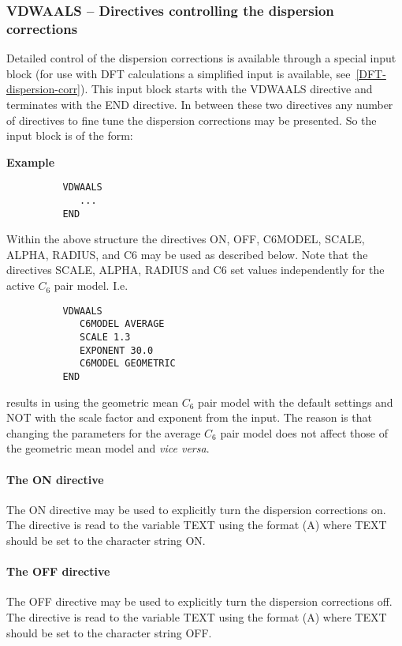 \documentclass[11pt,fleqn]{article}
\begin{document}
\subsubsection{VDWAALS -- Directives controlling the dispersion corrections}

Detailed control of the dispersion corrections is available through a special
input block (for use with DFT calculations a simplified input is available,
see~\ref{DFT-dispersion-corr}). This input block starts with the VDWAALS
directive and terminates with the END directive. In between these two
directives any number of directives to fine tune the dispersion corrections
may be presented. So the input block is of the form:

{\bf Example}

{
\footnotesize
\begin{verbatim}
          VDWAALS
             ...
          END
\end{verbatim}
}

Within the above structure the directives ON, OFF, C6MODEL, SCALE, ALPHA, 
RADIUS, and C6 may be used as described below. Note that the directives
SCALE, ALPHA, RADIUS and C6 set values independently for the active $C_6$ 
pair model. I.e. 
{
\footnotesize
\begin{verbatim}
          VDWAALS
             C6MODEL AVERAGE
             SCALE 1.3
             EXPONENT 30.0
             C6MODEL GEOMETRIC
          END
\end{verbatim}
} 
results in using the geometric mean $C_6$ pair model with the default settings
and NOT with the scale factor and exponent from the input. The reason is that
changing the parameters for the average $C_6$ pair model does not affect those
of the geometric mean model and {\it vice versa}.

\paragraph{The ON directive}

The ON directive may be used to explicitly turn the dispersion corrections on.
The directive is read to the variable TEXT using the format (A) where TEXT
should be set to the character string ON.

\paragraph{The OFF directive}

The OFF directive may be used to explicitly turn the dispersion corrections off.
The directive is read to the variable TEXT using the format (A) where TEXT
should be set to the character string OFF.
\end{document}
